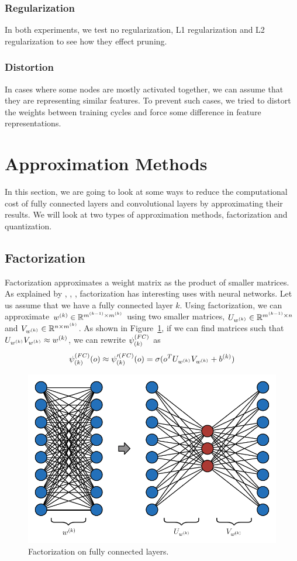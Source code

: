\subsubsection{Regularization}
In both experiments, we test no regularization, L1 regularization and L2 regularization to see how they effect pruning.

\subsubsection{Distortion}
In cases where some nodes are mostly activated together, we can assume that they are representing similar features. To prevent such cases, we tried to distort the weights between training cycles and force some difference in feature representations.
\fi

\section{Approximation Methods}
\label{sec:approximation}
In this section, we are going to look at some ways to reduce the computational cost of fully connected layers and convolutional layers by approximating their results. We will look at two types of approximation methods, factorization and quantization.

\subsection{Factorization}
Factorization approximates a weight matrix as the product of smaller matrices. As explained by \cite{zhang2016accelerating}, \cite{denton2014exploiting}, \cite{chung2016simplifying}, factorization has interesting uses with neural networks. Let us assume that we have a fully connected layer $k$. Using factorization, we can approximate $w^{(k)} \in \mathbb{R}^{m^{(k-1)} \times m^{(k)}}$ using two smaller matrices, $U_{w^{(k)}} \in \mathbb{R}^{m^{(k-1)} \times n}$ and $V_{w^{(k)}} \in \mathbb{R}^{n \times m^{(k)}}$. As shown in Figure~\ref{fig:factorization}, if we can find matrices such that $U_{w^{(k)}}V_{w^{(k)}} \approx w^{(k)}$, we can rewrite $\psi^{(FC)}_{(k)}$ as
$$\psi^{(FC)}_{(k)}(o) \approx \psi'^{(FC)}_{(k)}(o) = \sigma(o^T U_{w^{(k)}}V_{w^{(k)}} +b^{(k)})$$
\begin{figure}[!h]
  \includegraphics[width=1\textwidth]{images/factorization.pdf}
  \caption{Factorization on fully connected layers.}
  \label{fig:factorization}
\end{figure}

